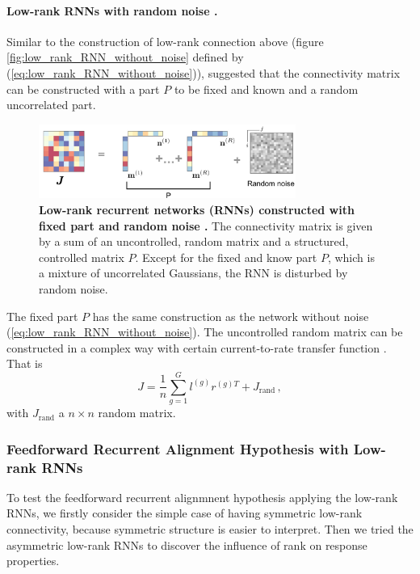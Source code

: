 \documentclass[11pt]{article}
\begin{document}
	\paragraph{Low-rank RNNs with random noise \cite{mastrogiuseppe2018linking}.}
	Similar to the construction of low-rank connection above (figure \ref{fig:low_rank_RNN_without_noise} defined by (\ref{eq:low_rank_RNN_without_noise})), \cite{mastrogiuseppe2018linking} suggested that the connectivity matrix can be constructed with a part $P$ to be fixed and known and a random uncorrelated part.
		\begin{figure} [H]
			\centering
			\includegraphics[width=0.75\textwidth]{../figures/low_rank_RNN_with_noise.pdf}
			\caption{\textbf{Low-rank recurrent networks (RNNs) constructed with fixed part and random noise \cite{mastrogiuseppe2018linking}.} The connectivity matrix is given by a sum of an uncontrolled, random matrix and a structured, controlled matrix $P$. Except for the fixed and know part $P$, which is a mixture of uncorrelated Gaussians, the RNN is disturbed by random noise.}
			\label{fig:low_rank_RNN_with_noise}
		\end{figure}
	The fixed part $P$ has the same construction as the network without noise (\ref{eq:low_rank_RNN_without_noise}). The uncontrolled random matrix can be constructed in a complex way with certain current-to-rate transfer function \cite{mastrogiuseppe2018linking}. 
	That is
		\begin{equation} \label{eq:low_rank_with_noise}
			J = \frac{1}{n} \sum_{g=1}^{G} l^{(g)} r^{(g)T} + J_{\text{rand}} \, ,
		\end{equation}
	with $J_{\text{rand}}$ a $n \times n$ random matrix. 
	
	\subsubsection{Feedforward Recurrent Alignment Hypothesis with Low-rank RNNs} \label{sec:ffrec_low_rank}
	To test the feedforward recurrent alignmnent hypothesis applying the low-rank RNNs, we firstly consider the simple case of having symmetric low-rank connectivity, because symmetric structure is easier to interpret. Then we tried the asymmetric low-rank RNNs to discover the influence of rank on response properties. 
	
\end{document}
